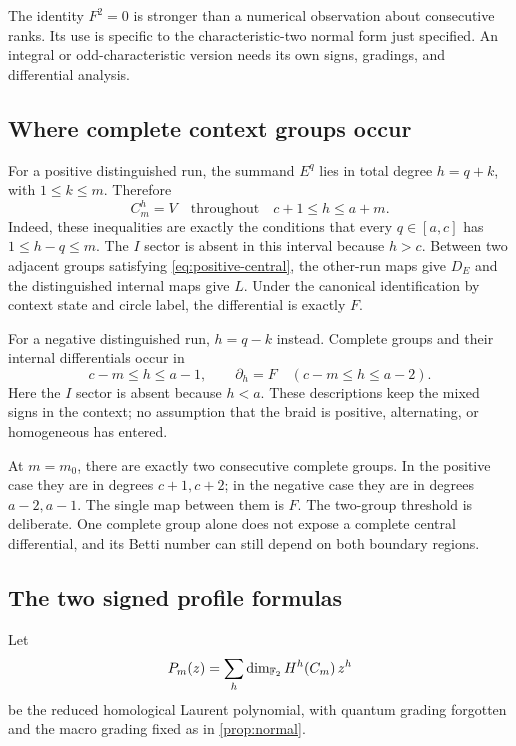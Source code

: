 The identity \(F^2=0\) is stronger than a numerical observation about
consecutive ranks. Its use is specific to the characteristic-two normal
form just specified. An integral or odd-characteristic version needs its
own signs, gradings, and differential analysis.

\subsection{Where complete context groups occur}

For a positive distinguished run, the summand \(E^q\) lies in total degree
\(h=q+k\), with \(1\le k\le m\). Therefore
\begin{equation}\label{eq:positive-central}
C_m^h=V\quad\text{throughout}\quad c+1\le h\le a+m.
\end{equation}
Indeed, these inequalities are exactly the conditions that every
\(q\in[a,c]\) has \(1\le h-q\le m\). The \(I\) sector is absent in
this interval because \(h>c\).
Between two adjacent groups satisfying \eqref{eq:positive-central},
the other-run maps give \(D_E\) and the distinguished internal maps give
\(L\). Under the canonical identification by context state and circle
label, the differential is exactly \(F\).

For a negative distinguished run, \(h=q-k\) instead. Complete groups and
their internal differentials occur in
\begin{equation}\label{eq:negative-central}
c-m\le h\le a-1,\qquad
\partial_h=F\quad(c-m\le h\le a-2).
\end{equation}
Here the \(I\) sector is absent because \(h<a\).
These descriptions keep the mixed signs in the context; no assumption
that the braid is positive, alternating, or homogeneous has entered.

At \(m=m_0\), there are exactly two consecutive complete groups. In the
positive case they are in degrees \(c+1,c+2\); in the negative case they
are in degrees \(a-2,a-1\). The single map between them is \(F\).
The two-group threshold is deliberate. One complete group alone does not
expose a complete central differential, and its Betti number can still
depend on both boundary regions.

\subsection{The two signed profile formulas}

Let
\[
P_m(z)=\sum_h\dim_{\mathbb F_2}H^h(C_m)\,z^h
\]
be the reduced homological Laurent polynomial, with quantum grading
forgotten and the macro grading fixed as in \cref{prop:normal}.

